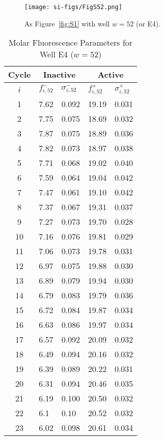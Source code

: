                 \begin{figure}
                    \centering
                    \texttt{[image: si-figs/FigS52.png]}
                    \caption{
                        As Figure~\ref{fig:S1} with well $w=52$ (or E4).
                    }
                \end{figure}
                \clearpage
    \begin{table}
        \caption{Molar Fluorescence Parameters for Well E4 ($w=52$)}
        \centering
        \begin{tabular}{c|ll|ll}
            Cycle & \multicolumn{2}{c|}{Inactive} & \multicolumn{2}{c}{Active} \\
            \hline
            $i$ & $f_{i,52}^{-}$ & $\sigma_{i,52}^{-}$ &  $f_{i,52}^{+}$ & $\sigma_{i,52}^{+}$ \\
            \hline
    1 & 7.62 & 0.092 & 19.19 & 0.031 \\
2 & 7.75 & 0.075 & 18.69 & 0.032 \\
3 & 7.87 & 0.075 & 18.89 & 0.036 \\
4 & 7.82 & 0.073 & 18.97 & 0.038 \\
5 & 7.71 & 0.068 & 19.02 & 0.040 \\
6 & 7.59 & 0.064 & 19.04 & 0.042 \\
7 & 7.47 & 0.061 & 19.10 & 0.042 \\
8 & 7.37 & 0.067 & 19.31 & 0.037 \\
9 & 7.27 & 0.073 & 19.70 & 0.028 \\
10 & 7.16 & 0.076 & 19.81 & 0.029 \\
11 & 7.06 & 0.073 & 19.78 & 0.031 \\
12 & 6.97 & 0.075 & 19.88 & 0.030 \\
13 & 6.89 & 0.079 & 19.94 & 0.030 \\
14 & 6.79 & 0.083 & 19.79 & 0.036 \\
15 & 6.72 & 0.084 & 19.87 & 0.034 \\
16 & 6.63 & 0.086 & 19.97 & 0.034 \\
17 & 6.57 & 0.092 & 20.09 & 0.032 \\
18 & 6.49 & 0.094 & 20.16 & 0.032 \\
19 & 6.39 & 0.089 & 20.22 & 0.031 \\
20 & 6.31 & 0.094 & 20.46 & 0.035 \\
21 & 6.19 & 0.100 & 20.50 & 0.032 \\
22 & 6.1 & 0.10 & 20.52 & 0.032 \\
23 & 6.02 & 0.098 & 20.61 & 0.034 \\

\end{tabular}
\end{table}
